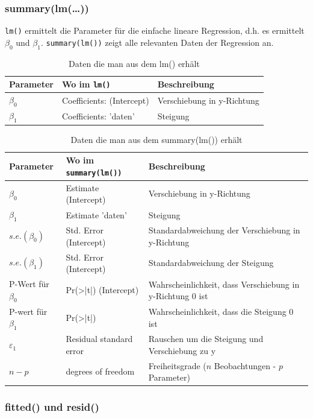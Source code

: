 \subsubsection{summary(lm(\dots))}
\verb!lm()! ermittelt die Parameter für die einfache lineare Regression, d.h.
es ermittelt $\beta_0$ und $\beta_1$.
\verb!summary(lm())! zeigt alle relevanten Daten der Regression an.
\begin{table}[h!]
	\centering
	\begin{tabular}{l|l|l}
	Parameter & Wo im \verb!lm()! & Beschreibung\\
	\hline
	$\beta_0$ & Coefficients: (Intercept) & Verschiebung in y-Richtung \\
	$\beta_1$ & Coefficients: 'daten' & Steigung \\
	\end{tabular}
	\caption{Daten die man aus dem lm() erhält}
\end{table}

\begin{table}[h!]
	\centering
	\begin{tabular}{l|l|p{}}
	Parameter & Wo im \verb!summary(lm())! & Beschreibung\\
	\hline
	$\beta_0$ & Estimate (Intercept) & Verschiebung in y-Richtung \\
	$\beta_1$ & Estimate 'daten' & Steigung \\
	$s.e.(\beta_0)$ & Std. Error (Intercept) & Standardabweichung der Verschiebung in y-Richtung\\
	$s.e.(\beta_1)$ & Std. Error (Intercept) & Standardabweichung der Steigung\\
	P-Wert für $\beta_0$ & Pr(>|t|) (Intercept) & Wahrscheinlichkeit, dass Verschiebung in y-Richtung 0 ist \\
	P-wert für $\beta_1$ & Pr(>|t|) & Wahrscheinlichkeit, dass die Steigung 0 ist\\
	$\varepsilon_1$ & Residual standard error & Rauschen um die Steigung und Verschiebung zu y\\
	$n-p$ & degrees of freedom & Freiheitsgrade ($n$ Beobachtungen - $p$ Parameter)\\
	\end{tabular}
	\caption{Daten die man aus dem summary(lm()) erhält}
\end{table}


\subsubsection{fitted() und resid()}



